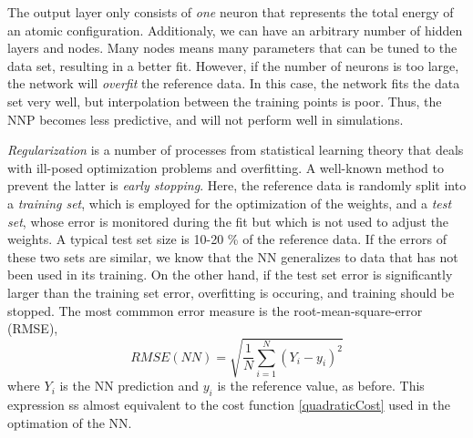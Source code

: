 \documentclass[twoside,english]{uiofysmaster}
\begin{document}
The output layer only consists of \textit{one} neuron that represents the total energy of an atomic 
configuration. Additionaly, we can have an arbitrary number of hidden layers and nodes. 
Many nodes means many parameters that can be tuned to the data set, resulting in a better fit.
However, if the number of neurons is too large, the network will \textit{overfit} the reference data. 
In this case, the network fits the data set very well, but interpolation between the training points is poor. Thus, 
the NNP becomes less predictive, and will not perform well in simulations.

\textit{Regularization} is a number of processes from statistical learning theory that deals with ill-posed optimization
problems and overfitting. A well-known method to prevent the latter is \textit{early stopping}. 
Here, the reference data is randomly split into 
a \textit{training set}, which is employed for the optimization of the weights, and a \textit{test set}, whose error is monitored
during the fit but which is not used to adjust the weights. A typical test set size is 10-20 \% of the reference data.
If the errors of these two sets are similar, we know that the NN
generalizes to data that has not been used in its training. On the other hand, if the test set error is significantly larger
than the training set error, overfitting is occuring, and training should be stopped. The most commmon error measure
is the root-mean-square-error (RMSE), 
\begin{equation}
 RMSE(NN) = \sqrt{\frac{1}{N}\sum_{i=1}^N (Y_i - y_i)^2}
\end{equation}
where $Y_i$ is the NN prediction and $y_i$ is the reference value, as before. 
This expression ss almost equivalent to the cost function \eqref{quadraticCost} used in the optimation of the NN.
\end{document}
